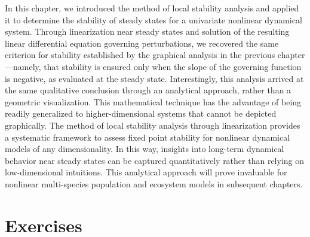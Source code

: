 In this chapter, we introduced the method of local stability analysis and applied it to determine the stability of steady states for a univariate nonlinear dynamical system. Through linearization near steady states and solution of the resulting linear differential equation governing perturbations, we recovered the same criterion for stability established by the graphical analysis in the previous chapter---namely, that stability is ensured only when the slope of the governing function is negative, as evaluated at the steady state. Interestingly, this analysis arrived at the same qualitative conclusion through an analytical approach, rather than a geometric visualization. This mathematical technique has the advantage of being readily generalized to higher-dimensional systems that cannot be depicted graphically. The method of local stability analysis through linearization provides a systematic framework to assess fixed point stability for nonlinear dynamical models of any dimensionality. In this way, insights into long-term dynamical behavior near steady states can be captured quantitatively rather than relying on low-dimensional intuitions. This analytical approach will prove invaluable for nonlinear multi-species population and ecosystem models in subsequent chapters.

\section*{Exercises}

